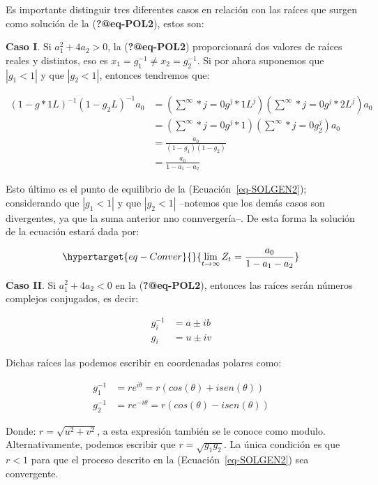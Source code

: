 \documentclass[
  a4paper,
]{article}
\begin{document}
Es importante distinguir tres diferentes casos en relación con las
raíces que surgen como solución de la (\textbf{?@eq-POL2}), estos son:

\textbf{Caso I}. Si \(a^2_1 + 4 a_2 > 0\), la (\textbf{?@eq-POL2})
proporcionará dos valores de raíces reales y distintos, eso es
\(x_1 = g^{-1}_1 \neq x_2 = g^{-1}_2\). Si por ahora suponemos que
\(|{g_1} < 1|\) y que \(|{g_2} < 1|\), entonces tendremos que:

\begin{align}
(1 - g*1 L)^{-1} (1 - g_2 L)^{-1} a_0 & = \left( \sum^{\infty}*{j = 0}{g^j*1 L^j} \right) \left( \sum^{\infty}*{j = 0}{g^j*2 L^j} \right) a_0 \nonumber \\
& = \left( \sum^{\infty}*{j = 0}{g^j*1} \right) \left( \sum^{\infty}*{j = 0}{g^j_2} \right) a_0 \nonumber \\
& = \frac{a_0}{(1 - g_1)(1 - g_2)} \nonumber \\
& = \frac{a_0}{1 - a_1 - a_2}
\end{align}

Esto último es el punto de equilibrio de la (Ecuación~\ref{eq-SOLGEN2});
considerando que \(|{g_1} < 1|\) y que \(|{g_2} < 1|\) --notemos que los
demás casos son divergentes, ya que la suma anterior nno connvergería--.
De esta forma la solución de la ecuación estará dada por:

\begin{equation}\protect\hypertarget{eq-Conver}{}{
\lim_{t \to \infty} Z_t = \frac{a_0}{1 - a_1 - a_2}
}\label{eq-Conver}\end{equation}

\textbf{Caso II}. Si \(a_1^2 + 4a_2 < 0\) en la (\textbf{?@eq-POL2}),
entonces las raíces serán números complejos conjugados, es decir:

\begin{align}
g_i^{-1} & = a \pm ib \\
g_i & = u \pm iv
\end{align}

Dichas raíces las podemos escribir en coordenadas polares como:

\begin{align}
g_1^{-1} & = r e^{i \theta} = r (cos(\theta) + i sen(\theta)) \\
g_2^{-1} & = r e^{-i \theta} = r (cos(\theta) - i sen(\theta))
\end{align}

Donde: \(r = \sqrt{u^2 + v^2}\), a esta expresión también se le conoce
como modulo. Alternativamente, podemos escribir que
\(r = \sqrt{g_1 g_2}\). La única condición es que \(r < 1\) para que el
proceso descrito en la (Ecuación~\ref{eq-SOLGEN2}) sea convergente.
\end{document}
